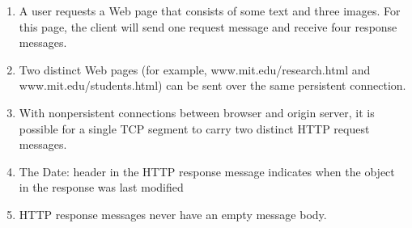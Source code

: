 \begin{enumerate}

\item A user requests a Web page that consists of some text and three images. For this page, the client will send one request message and receive four response messages.



\item Two distinct Web pages (for example, www.mit.edu/research.html and www.mit.edu/students.html) can be sent over the same persistent connection.



\item With nonpersistent connections between browser and origin server, it is possible for a single TCP segment to carry two distinct HTTP request messages.



\item The Date: header in the HTTP response message indicates when the object in the response was last modified


\item  HTTP response messages never have an empty message body.





\end{enumerate}

